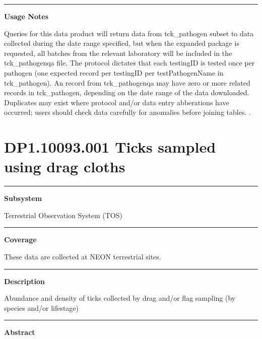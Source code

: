 \documentclass[]{article}
\begin{document}
\begin{center}\rule{0.5\linewidth}{\linethickness}\end{center}

\textbf{Usage Notes}

Queries for this data product will return data from tck\_pathogen subset
to data collected during the date range specified, but when the expanded
package is requested, all batches from the relevant laboratory will be
included in the tck\_pathogenqa file. The protocol dictates that each
testingID is tested once per pathogen (one expected record per testingID
per testPathogenName in tck\_pathogen). An record from tck\_pathogenqa
may have zero or more related records in tck\_pathogen, depending on the
date range of the data downloaded. Duplicates may exist where protocol
and/or data entry abberations have occurred; users should check data
carefully for anomalies before joining tables. \newpage
.

\section{DP1.10093.001 Ticks sampled using drag
cloths}\label{dp1.10093.001-ticks-sampled-using-drag-cloths}

\begin{center}\rule{0.5\linewidth}{\linethickness}\end{center}

\textbf{Subsystem}

Terrestrial Observation System (TOS)

\begin{center}\rule{0.5\linewidth}{\linethickness}\end{center}

\textbf{Coverage}

These data are collected at NEON terrestrial sites.

\begin{center}\rule{0.5\linewidth}{\linethickness}\end{center}

\textbf{Description}

Abundance and density of ticks collected by drag and/or flag sampling
(by species and/or lifestage)

\begin{center}\rule{0.5\linewidth}{\linethickness}\end{center}

\textbf{Abstract}
\end{document}
